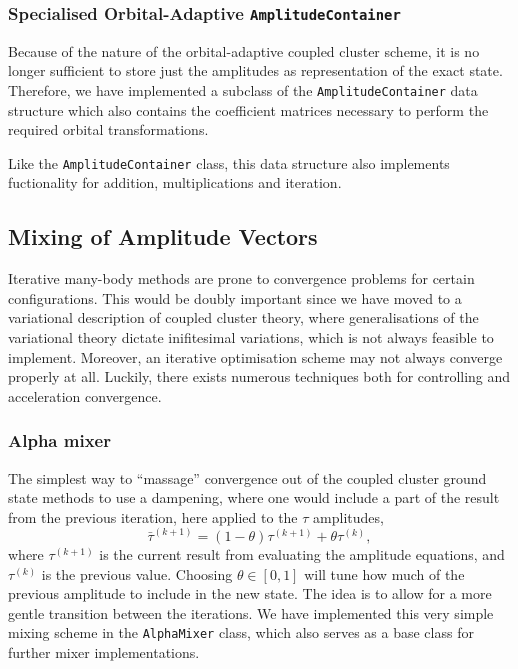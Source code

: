     \subsubsection{Specialised Orbital-Adaptive \lstinline{AmplitudeContainer}}

    Because of the nature of the orbital-adaptive coupled cluster scheme, it is no 
    longer sufficient to store just the amplitudes as representation of the exact 
    state. Therefore, we have implemented a subclass of the \lstinline{AmplitudeContainer}
    data structure which also contains the coefficient matrices necessary to perform the 
    required orbital transformations.

    

    Like the \lstinline{AmplitudeContainer} class, this data structure also implements 
    fuctionality for addition, multiplications and iteration.
    
\subsection{Mixing of Amplitude Vectors}

    Iterative many-body methods are prone to convergence problems for certain configurations.
    This would be doubly important since we have moved to a variational description 
    of coupled cluster theory,
    where generalisations of the variational theory dictate inifitesimal variations, which 
    is not always feasible to implement.
    Moreover, an iterative optimisation scheme may not always converge properly at all. 
    Luckily, there exists numerous techniques both for controlling and acceleration 
    convergence.

    \subsubsection{Alpha mixer}

    The simplest way to ``massage'' convergence out of the coupled cluster ground state methods
    to use a dampening, where one would include a part of the result from the previous 
    iteration, here applied to the $\tau$ amplitudes,
    \begin{equation}
        \bar{\tau}^{(k+1)} = (1 - \theta)\tau^{(k+1)} + \theta\tau^{(k)},
    \end{equation}
    where $\tau^{(k+1)}$ is the current result from evaluating the amplitude equations, 
    and $\tau^{(k)}$ is the previous value. Choosing $\theta \in [0,1]$ will tune how
    much of the previous amplitude to include in the new state. The idea is to allow for 
    a more gentle transition between the iterations. We have implemented this 
    very simple mixing scheme in the \lstinline{AlphaMixer} class, which also serves as 
    a base class for further mixer implementations.

